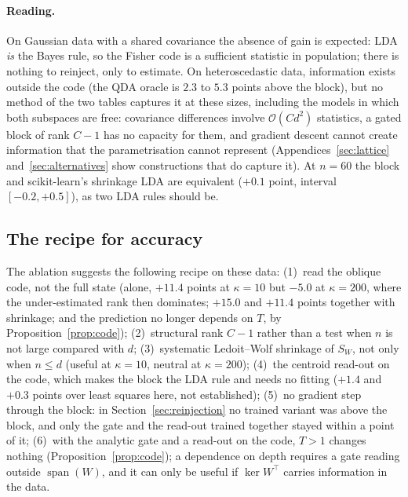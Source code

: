 \documentclass[11pt,a4paper]{article}
\theoremstyle{plain}
\theoremstyle{definition}
\theoremstyle{remark}
\newcommand{\spn}{\operatorname{span}}
\newcommand{\T}{\top}
\begin{document}
\paragraph{Reading.} On Gaussian data with a shared covariance the absence
of gain is expected: LDA \emph{is} the Bayes rule, so the Fisher code is a
sufficient statistic in population; there is nothing to reinject, only to
estimate. On heteroscedastic data, information exists outside the code
(the QDA oracle is $2.3$ to $5.3$ points above the block), but no method
of the two tables captures it at these sizes, including the models in
which both subspaces are free: covariance differences involve
$\mathcal O(Cd^2)$ statistics, a gated block of rank $C-1$ has no capacity
for them, and gradient descent cannot create information that the
parametrisation cannot represent (Appendices~\ref{sec:lattice}
and~\ref{sec:alternatives} show constructions that do capture it). At
$n=60$ the block and scikit-learn's shrinkage LDA are equivalent ($+0.1$
point, interval $[-0.2,+0.5]$), as two LDA rules should be.

\subsection{The recipe for accuracy}
The ablation suggests the following recipe on these data: (1)~read the
oblique code, not the full state (alone, $+11.4$ points at $\kappa=10$ but
$-5.0$ at $\kappa=200$, where the under-estimated rank then dominates;
$+15.0$ and $+11.4$ points together with shrinkage; and the prediction no
longer depends on $T$, by Proposition~\ref{prop:code}); (2)~structural rank $C-1$ rather
than a test when $n$ is not large compared with $d$; (3)~systematic
Ledoit--Wolf shrinkage of $S_W$, not only when $n\le d$ (useful at
$\kappa=10$, neutral at $\kappa=200$); (4)~the centroid read-out on the
code, which makes the block the LDA rule and needs no fitting ($+1.4$ and
$+0.3$ points over least squares here, not established); (5)~no gradient
step through the block: in Section~\ref{sec:reinjection} no trained
variant was above the block, and only the gate and the read-out trained
together stayed within a point of it; (6)~with the analytic gate and a read-out on the code,
$T>1$ changes nothing (Proposition~\ref{prop:code}); a dependence on depth
requires a gate reading outside $\spn(W)$, and it can only be useful if
$\ker W^\T$ carries information in the data.
\end{document}

